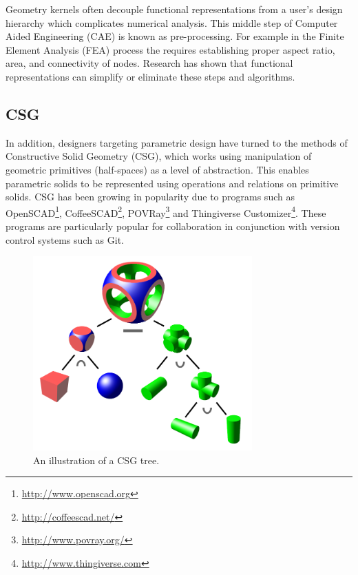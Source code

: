 \documentclass[a4paper]{article}
\begin{document}
Geometry kernels often decouple functional representations from a user's design
hierarchy which complicates numerical analysis.\cite{lee2005cad}
This middle step of Computer Aided Engineering (CAE) is known as pre-processing.
For example in the Finite Element Analysis (FEA) process the requires
establishing proper aspect ratio, area, and connectivity of nodes. Research has shown that functional representations can simplify or eliminate these steps and algorithms.





\subsection{CSG}

In addition, designers targeting parametric design have turned to the methods
of Constructive Solid Geometry (CSG), which works using manipulation of
geometric primitives (half-spaces) as a level of abstraction.
This enables parametric solids to be represented using operations and
relations on primitive solids. CSG has been growing in popularity due
to programs such as OpenSCAD\footnote{\url{http://www.openscad.org}},
CoffeeSCAD\footnote{\url{http://coffeescad.net/}},
POVRay\footnote{\url{http://www.povray.org/}}
and Thingiverse Customizer\footnote{\url{http://www.thingiverse.com}}.
These programs are particularly popular for collaboration
in conjunction with version control systems such as Git.

\begin{figure}[h!]
  \centering
    \includegraphics[width=0.75\textwidth]{img/csg_tree.png}
  \caption{An illustration of a CSG tree.}
\end{figure}
\end{document}
